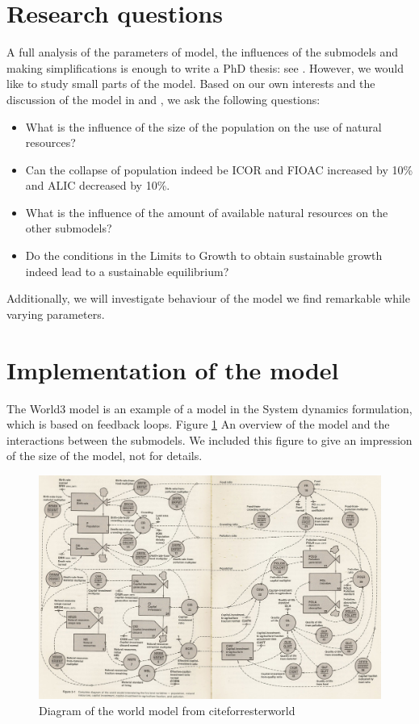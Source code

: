 \documentclass[10pt,a4paper]{scrartcl}
\begin{document}
\section*{Research questions}

A full analysis of the parameters of model, the influences of the submodels and making simplifications is enough to write a PhD thesis: see \cite{thissen1978investigations}. However, we would like to study small parts of the model. Based on our own interests and the discussion of the model in \cite{thissen1978investigations} and \cite{vermeulen1976parameter}, we ask the following questions:

\begin{itemize}
	\item What is the influence of the size of the population on the use of natural resources?
	\item Can the collapse of population indeed be ICOR and FIOAC increased by 10\% and ALIC decreased by 10\%.
	\item What is the influence of the amount of available natural resources on the other submodels?
	\item Do the conditions in the Limits to Growth to obtain sustainable growth indeed lead to a sustainable equilibrium?
\end{itemize}

Additionally, we will investigate behaviour of the model we find remarkable while varying parameters.

\section*{Implementation of the model}

The World3 model is an example of a model in the System dynamics formulation, which is based on feedback loops. Figure \ref{world3} An overview of the model and the interactions between the submodels. We included this figure to give an impression of the size of the model, not for details.

\begin{figure}
\centering
\includegraphics[width=\textwidth]{./plaatjes/model.jpg}
\caption{Diagram of the world model from cite{forresterworld}}
\label{world3}
\end{figure}
\end{document}
